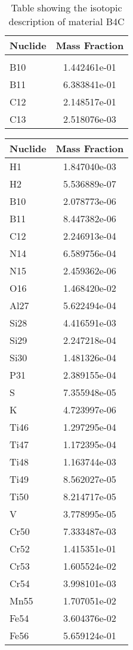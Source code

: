 \begin{centering}
\begin{table}[ht!]
\begin{tabular}{l | c}
\hline
Nuclide & Mass Fraction\\
\hline
\\
B10 & 1.442461e-01\\
B11 & 6.383841e-01\\
C12 & 2.148517e-01\\
C13 & 2.518076e-03
\end{tabular}
\caption{Table showing the isotopic description of material B4C}
\label{table:material_B4C}
\end{table}\clearpage

\begin{table}[ht!]
\begin{tabular}{l | c}
\hline
Nuclide & Mass Fraction\\
\hline
H1 & 1.847040e-03\\
H2 & 5.536889e-07\\
B10 & 2.078773e-06\\
B11 & 8.447382e-06\\
C12 & 2.246913e-04\\
N14 & 6.589756e-04\\
N15 & 2.459362e-06\\
O16 & 1.468420e-02\\
Al27 & 5.622494e-04\\
Si28 & 4.416591e-03\\
Si29 & 2.247218e-04\\
Si30 & 1.481326e-04\\
P31 & 2.389155e-04\\
S & 7.355948e-05\\
K & 4.723997e-06\\
Ti46 & 1.297295e-04\\
Ti47 & 1.172395e-04\\
Ti48 & 1.163744e-03\\
Ti49 & 8.562027e-05\\
Ti50 & 8.214717e-05\\
V & 3.778995e-05\\
Cr50 & 7.333487e-03\\
Cr52 & 1.415351e-01\\
Cr53 & 1.605524e-02\\
Cr54 & 3.998101e-03\\
Mn55 & 1.707051e-02\\
Fe54 & 3.604376e-02\\
Fe56 & 5.659124e-01\\

\end{tabular}
\end{table}
\end{centering}
